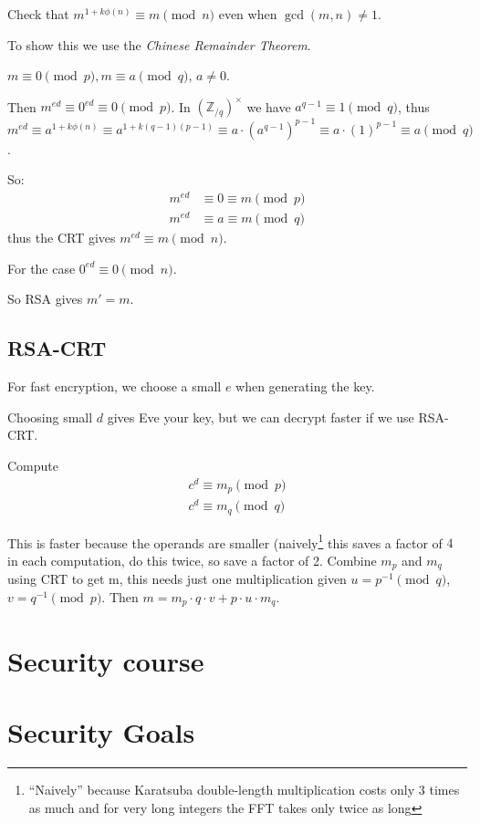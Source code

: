 \documentclass{article}
\newcommand{\ZZ}{\mathbb{Z}}
\newcommand{\ZZx}[1]{(\ZZ_{/#1})^\times}
\begin{document}
Check that $m^{1 + k\phi(n)} \equiv m \pmod{n}$ even when $\gcd(m, n) \ne 1$.

To show this we use the \emph{Chinese Remainder Theorem}.

$m \equiv 0 \pmod{p}, m \equiv a \pmod{q}$, $a \ne 0$.

Then $m^{ed} \equiv 0^{ed} \equiv 0 \pmod{p}$. In $\ZZx{q}$ we 
have $a^{q-1} \equiv 1 \pmod{q}$, thus $m^{ed} \equiv a^{1 + k\phi(n)} \equiv a^{1 + k(q-1)(p-1)}
\equiv a \cdot (a^{q-1})^{p-1} \equiv a \cdot (1)^{p-1} \equiv a \pmod{q}$.

So:
\begin{align*}
    m^{ed} &\equiv 0 \equiv m \pmod p \\
    m^{ed} &\equiv a \equiv m \pmod q 
\end{align*}
thus the CRT gives $m^{ed} \equiv m \pmod{n}$.

For the case $0^{ed} \equiv 0 \pmod{n}$.

So RSA gives $m' = m$.

\subsection{RSA-CRT}

For fast encryption, we choose a small $e$ when generating the key.

Choosing small $d$ gives Eve your key, but we can decrypt faster if we
use RSA-CRT.

Compute \begin{align*}
    c^d \equiv m_p \pmod p \\
    c^d \equiv m_q \pmod q
\end{align*}

This is faster because the operands are smaller (naively\footnote{``Naively''
because Karatsuba double-length multiplication costs only 3 times as much and
for very long integers the FFT takes only twice as long} this saves a factor of
$4$ in each computation, do this twice, so save a factor of 2. Combine $m_p$ and
$m_q$ using CRT to get m, this needs just one multiplication given $u = p^{-1}
\pmod q$, $v = q^{-1} \pmod p$. Then $m = m_p \cdot q \cdot v + p \cdot u \cdot
m_q$.

\section {Security course}
\section{Security Goals}
\end{document}
